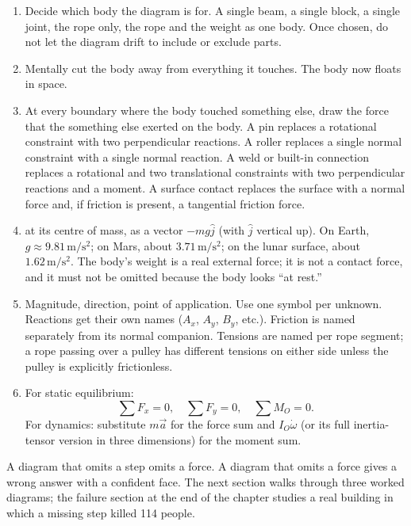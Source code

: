 \begin{enumerate}
  \item {} Decide which body the diagram is
    for. A single beam, a single block, a single joint, the rope only,
    the rope and the weight as one body. Once chosen, do not let the
    diagram drift to include or exclude parts.
  \item {} Mentally cut the body away from everything
    it touches. The body now floats in space.
  \item {} At every
    boundary where the body touched something else, draw the force
    that the something else exerted on the body. A pin replaces a
    rotational constraint with two perpendicular reactions. A roller
    replaces a single normal constraint with a single normal
    reaction. A weld or built-in connection replaces a rotational and
    two translational constraints with two perpendicular reactions
    and a moment. A surface contact replaces the surface with a
    normal force and, if friction is present, a tangential friction
    force.
  \item {} at its centre of mass, as a
    vector $-mg\hat{j}$ (with $\hat{j}$ vertical up). On Earth, $g
    \approx 9.81\,\si{\meter\per\second\squared}$; on Mars, about
    $3.71\,\si{\meter\per\second\squared}$; on the lunar surface, about
    $1.62\,\si{\meter\per\second\squared}$. The body's weight is a
    real external force; it is not a contact force, and it must not be
    omitted because the body looks ``at rest.''
  \item {} Magnitude, direction, point of
    application. Use one symbol per unknown. Reactions get their own
    names ($A_x$, $A_y$, $B_y$, etc.). Friction is named
    separately from its normal companion. Tensions are named per
    rope segment; a rope passing over a pulley has different
    tensions on either side unless the pulley is explicitly
    frictionless.
  \item {} For static equilibrium:
    \[
    \sum F_x = 0, \quad \sum F_y = 0, \quad \sum M_O = 0.
    \]
    For dynamics: substitute $m\vec{a}$ for the force sum and
    $I_O \dot\omega$ (or its full inertia-tensor version in three
    dimensions) for the moment sum.
\end{enumerate}

A diagram that omits a step omits a force. A diagram that omits a
force gives a wrong answer with a confident face. The next section
walks through three worked diagrams; the failure section at the end of
the chapter studies a real building in which a missing step killed
114 people.

